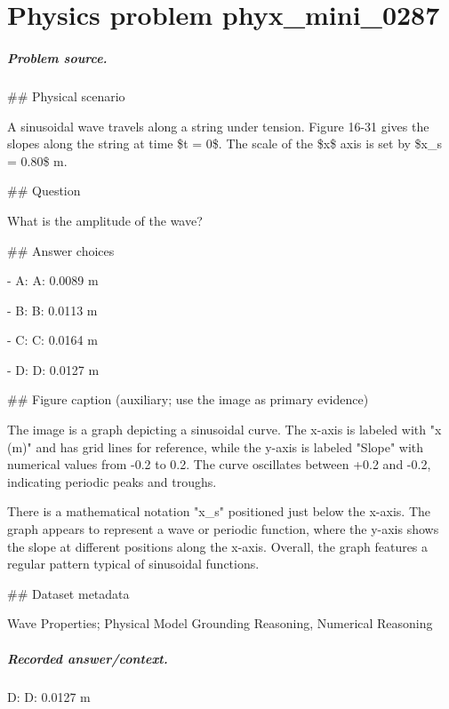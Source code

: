 
\chapter{Physics problem phyx\_mini\_0287}
\label{ch:PhyXMiniProblems_problem_phyx_mini_0287}

\paragraph{Problem source.}
\#\# Physical scenario

A sinusoidal wave travels along a string under tension. Figure 16-31 gives the slopes along the string at time \$t = 0\$. The scale of the \$x\$ axis is set by \$x\_s = 0.80\$ m.

\#\# Question

What is the amplitude of the wave?

\#\# Answer choices

- A: A: 0.0089 m

- B: B: 0.0113 m

- C: C: 0.0164 m

- D: D: 0.0127 m

\#\# Figure caption (auxiliary; use the image as primary evidence)

The image is a graph depicting a sinusoidal curve. The x-axis is labeled with "x (m)" and has grid lines for reference, while the y-axis is labeled "Slope" with numerical values from -0.2 to 0.2. The curve oscillates between +0.2 and -0.2, indicating periodic peaks and troughs.

There is a mathematical notation "x\_s" positioned just below the x-axis. The graph appears to represent a wave or periodic function, where the y-axis shows the slope at different positions along the x-axis. Overall, the graph features a regular pattern typical of sinusoidal functions.

\#\# Dataset metadata

Wave Properties; Physical Model Grounding Reasoning, Numerical Reasoning

\paragraph{Recorded answer/context.}
D: D: 0.0127 m

